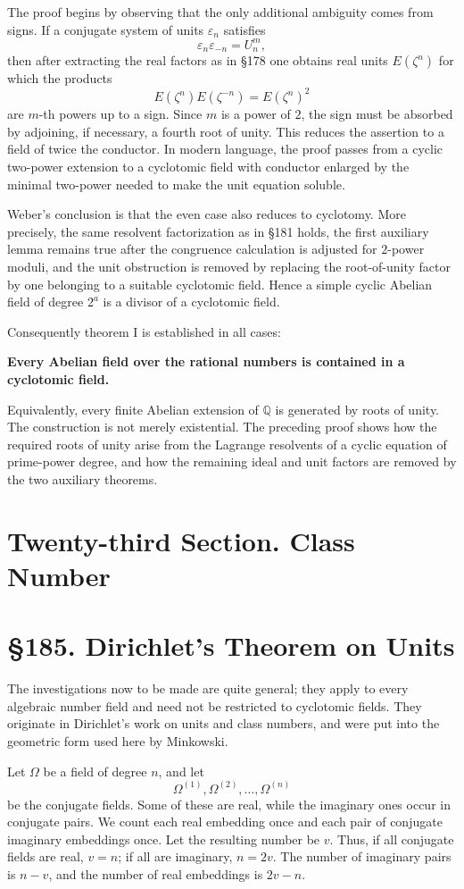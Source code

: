 \documentclass[12pt,a4paper]{article}
\newcommand{\webersection}[2]{\clearpage\section*{\S #1. #2}}
\newcommand{\booktitle}[1]{\clearpage\section*{#1}}
\newcommand{\zetaS}{\zeta}
\begin{document}
The proof begins by observing that the only additional ambiguity comes from signs.  If a conjugate system of units \(\varepsilon_n\) satisfies
\[
  \varepsilon_n\varepsilon_{-n}=U_n^m,
\tag{1}
\]
then after extracting the real factors as in \S178 one obtains real units \(E(\zetaS^n)\) for which the products
\[
  E(\zetaS^n)E(\zetaS^{-n})=E(\zetaS^n)^2
\]
are \(m\)-th powers up to a sign.  Since \(m\) is a power of \(2\), the sign must be absorbed by adjoining, if necessary, a fourth root of unity.  This reduces the assertion to a field of twice the conductor.  In modern language, the proof passes from a cyclic two-power extension to a cyclotomic field with conductor enlarged by the minimal two-power needed to make the unit equation soluble.

Weber's conclusion is that the even case also reduces to cyclotomy.  More precisely, the same resolvent factorization as in \S181 holds, the first auxiliary lemma remains true after the congruence calculation is adjusted for \(2\)-power moduli, and the unit obstruction is removed by replacing the root-of-unity factor by one belonging to a suitable cyclotomic field.  Hence a simple cyclic Abelian field of degree \(2^a\) is a divisor of a cyclotomic field.

Consequently theorem I is established in all cases:

\textbf{Every Abelian field over the rational numbers is contained in a cyclotomic field.}

Equivalently, every finite Abelian extension of \(\mathbb Q\) is generated by roots of unity.  The construction is not merely existential.  The preceding proof shows how the required roots of unity arise from the Lagrange resolvents of a cyclic equation of prime-power degree, and how the remaining ideal and unit factors are removed by the two auxiliary theorems.

\booktitle{Twenty-third Section. Class Number}

\webersection{185}{Dirichlet's Theorem on Units}

The investigations now to be made are quite general; they apply to every algebraic number field and need not be restricted to cyclotomic fields.  They originate in Dirichlet's work on units and class numbers, and were put into the geometric form used here by Minkowski.

Let \(\Omega\) be a field of degree \(n\), and let
\[
  \Omega^{(1)},\Omega^{(2)},\ldots,\Omega^{(n)}
\]
be the conjugate fields.  Some of these are real, while the imaginary ones occur in conjugate pairs.  We count each real embedding once and each pair of conjugate imaginary embeddings once.  Let the resulting number be \(v\).  Thus, if all conjugate fields are real, \(v=n\); if all are imaginary, \(n=2v\).  The number of imaginary pairs is \(n-v\), and the number of real embeddings is \(2v-n\).
\end{document}
